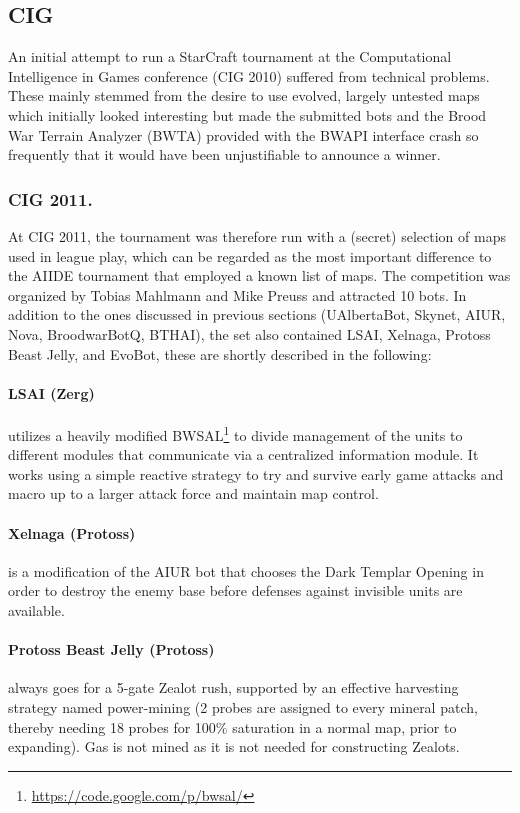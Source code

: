 \documentclass{llncs}
\begin{document}
\subsection*{CIG}
\label{sec:cig2011}

An initial attempt to run a StarCraft tournament at the Computational
Intelligence in Games conference (CIG 2010) suffered from technical problems.
These mainly stemmed from the desire to use evolved, largely untested
maps which initially looked interesting but made the submitted bots and the Brood War Terrain Analyzer (BWTA) provided with the BWAPI interface crash
so frequently that it would have been unjustifiable to announce a winner.

\subsubsection*{CIG 2011.}

At CIG 2011, the tournament was therefore run with a (secret) selection
of maps used in league play, which can be regarded as the most important
difference to the AIIDE tournament that employed a known list of maps.
The competition was organized by Tobias Mahlmann and Mike
Preuss and attracted 10 bots. In addition to the ones discussed in previous
sections (UAlbertaBot, Skynet, AIUR, Nova, BroodwarBotQ, BTHAI), 
the set also contained LSAI, Xelnaga, Protoss Beast Jelly, and EvoBot,
these are shortly described in the following:

\paragraph*{LSAI (Zerg)} utilizes a heavily modified BWSAL\footnote{\url{https://code.google.com/p/bwsal/}} to divide management
 of the units to different modules that communicate via a centralized information
 module. It works using a simple reactive strategy to try and survive early game
 attacks and macro up to a larger attack force and maintain map control.
 
\paragraph*{Xelnaga (Protoss)} is a modification of the AIUR bot that chooses the 
Dark Templar Opening in order to destroy the enemy base before defenses against
invisible units are available. 

\paragraph*{Protoss Beast Jelly (Protoss)}
always goes for a 5-gate Zealot rush, supported by an effective harvesting 
strategy named power-mining (2 probes are assigned to every mineral patch,
thereby needing 18 probes for 100\% saturation in a normal map, prior
to expanding). Gas is not mined as it is not needed for constructing Zealots.
\end{document}
